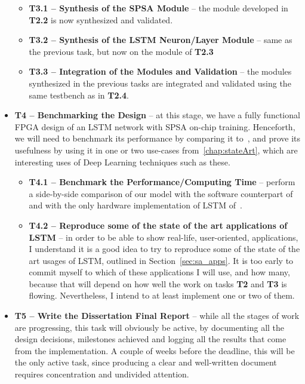 \begin{itemize}
        \begin{itemize}
            \item \textbf{T3.1 -- Synthesis of the SPSA Module} -- the module developed in \textbf{T2.2} is now synthesized and validated.
            \item \textbf{T3.2 -- Synthesis of the LSTM Neuron/Layer Module} -- same as the previous task, but now on the module of \textbf{T2.3}
            \item \textbf{T3.3 -- Integration of the Modules and Validation} -- the modules synthesized in the previous tasks are integrated and validated using the same testbench as in \textbf{T2.4}.
        \end{itemize}

    \item \textbf{T4 -- Benchmarking the Design} -- at this stage, we have a fully functional FPGA design of an LSTM network with SPSA on-chip training. Henceforth, we will need to benchmark its performance by comparing it to~\cite{Tavear13, Hochreiter07}, and prove its usefulness by using it in one or two use-cases from~\ref{chap:stateArt}, which are interesting uses of Deep Learning techniques such as these.

        \begin{itemize}
            \item \textbf{T4.1 -- Benchmark the Performance/Computing Time} -- perform a side-by-side comparison of our model with the software counterpart of~\cite{Tavear13, Hochreiter07} and with the only hardware implementation of LSTM of~\cite{Chang15}.
            \item \textbf{T4.2 -- Reproduce some of the state of the art applications of LSTM} -- in order to be able to show real-life, user-oriented, applications, I understand it is a good idea to try to reproduce some of the state of the art usages of LSTM, outlined in Section~\ref{sec:sa_apps}. It is too early to commit myself to which of these applications I will use, and how many, because that will depend on how well the work on tasks \textbf{T2} and \textbf{T3} is flowing. Nevertheless, I intend to at least implement one or two of them.
        \end{itemize}

    \item \textbf{T5 -- Write the Dissertation Final Report} -- while all the stages of work are progressing, this task will obviously be active, by documenting all the design decisions, milestones achieved and logging all the results that come from the implementation. A couple of weeks before the deadline, this will be the only active task, since producing a clear and well-written document requires concentration and undivided attention.

\end{itemize}

